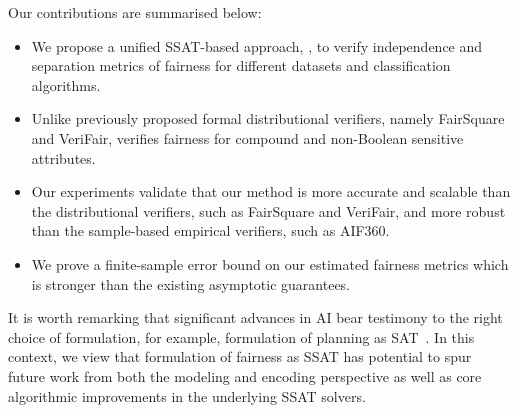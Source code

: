 Our contributions are summarised below:
\begin{itemize}
	\item We propose a unified SSAT-based approach, {\justicia}, to verify independence and separation metrics of fairness for different datasets and classification algorithms.
	\item Unlike previously proposed formal distributional verifiers, namely FairSquare and VeriFair, {\justicia} verifies fairness for compound and non-Boolean sensitive attributes.%
	\item Our experiments validate that our method is more accurate and scalable than the distributional verifiers, such as FairSquare and VeriFair, and more robust than the sample-based empirical verifiers, such as AIF360.
	\item We prove a finite-sample error bound on our estimated fairness metrics which is stronger than the existing asymptotic guarantees.
\end{itemize}

It is worth remarking that significant advances in AI bear testimony to the right choice of formulation, for example, formulation of planning as SAT~\cite{kautz1992planning}. In this context, we view that formulation of fairness as SSAT has potential to spur future work from both the modeling and encoding perspective as well as core algorithmic improvements in the underlying SSAT solvers.  

